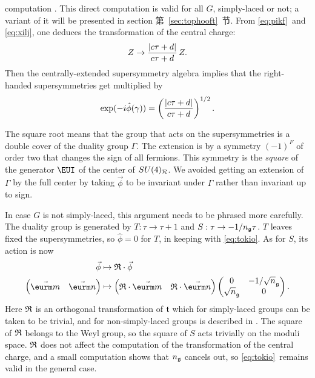 computation \cite{ref50}.  This direct computation is valid for
all $G$, simply-laced or not; a variant of it will be presented in
section 第~\ref{sec:tophooft}~节. From \eqref{eq:pikf}\ and \eqref{eq:xilj}, one deduces the
transformation of the central charge: %
\setcounter{equation}{23}
\begin{equation}\label{eq:mujk}
Z\to
{|c\tau+d|\over {c\tau+d}}\, Z.
\end{equation}
 Then the centrally-extended
supersymmetry algebra implies that the right-handed
supersymmetries get multiplied by
\setcounter{equation}{24}
\begin{equation}\label{eq:tokio}
\exp(-i\hat\phi(\gamma))=\left({|c\tau+d|\over
{c\tau+d}}\right)^{1/2}.
\end{equation}

The square root means that the group that acts on the
supersymmetries is a double cover of the duality group $\Gamma$.
The extension is by a symmetry $(-1)^F$ of order two that changes
the sign of all fermions. This symmetry is the {\it square} of the
generator ${\EUI} $ of the center of $SU(4)_{\cal R}$. We avoided
getting an extension of $\Gamma$ by the full center by taking
$\vec{\phi}$ to be invariant under $\Gamma$ rather than invariant
up to sign.

In case $G$ is not simply-laced, this argument needs to be phrased
more carefully.  The duality group is generated by $T:\tau\to
\tau+1$ and $S:\tau\to -1/n_{\frak g}\tau$.  $T$ leaves fixed the
supersymmetries, so $\hat\phi=0$ for $T$, in keeping with \eqref{eq:tokio}.
As for $S$, its action is now %
\setcounter{equation}{25}
\begin{equation}\label{eq:xiljo}
\begin{aligned}\vec{\phi} &
\mapsto {\frak R}\cdot\vec{\phi}\\\left(\begin{matrix}\vec{{\eurm m}} &
\vec{{\eurm n}}\end{matrix}\right)&\mapsto \left(\begin{matrix}{\frak R}\cdot
\vec{{\eurm m}} & {\frak R}\cdot\vec{{\eurm
n}}\end{matrix}\right)\left(\begin{matrix}0 & -1/\sqrt n_{\frak g} \\ \sqrt
n_{\frak g} & 0 \\\end{matrix}\right).\end{aligned}
\end{equation}
 Here $\frak R$ is an orthogonal
transformation of $\frak t$ which for simply-laced groups can be
taken to be trivial, and for non-simply-laced groups is described
in \cite{ref47}. The square of $\frak R$ belongs to the Weyl group, so the
square of $S$ acts trivially on the moduli space. $\frak R$ does
not affect the computation of the transformation of the central
charge, and a small computation shows that $n_{\frak g}$ cancels
out, so \eqref{eq:tokio}\ remains valid in the general case.
